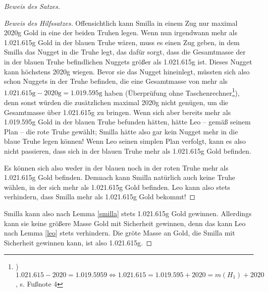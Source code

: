\begin{proof}[Beweis des Satzes]
\begin{proof}[Beweis des Hilfssatzes]
        Offensichtlich kann Smilla in einem Zug nur maximal 2020g Gold  in eine der beiden Truhen legen. Wenn nun 
        irgendwann mehr als 1.021.615g Gold in der blauen Truhe wären, muss es einen Zug geben, in dem Smilla das 
        Nugget in die Truhe legt, das dafür sorgt, dass die Gesamtmasse der in der blauen Truhe befindlichen Nuggets 
        größer als 1.021.615g ist. Dieses Nugget kann höchstens 2020g wiegen. Bevor sie das Nugget hineinlegt, 
        müssten sich also schon Nuggets in der Truhe befinden, die eine Gesamtmasse von mehr als $1.021.615\text{g}-
        2020\text{g}=1.019.595\text{g}$ haben (Überprüfung ohne Taschenrechner\footnote{) $1.021.615-2020=
        1.019.5959 \Leftrightarrow 1.021.615=1.019.595+2020=m(H_1)+2020$, s. Fußnote 4}), 
        denn sonst würden die zusätzlichen maximal 2020g nicht genügen, um die Gesamtmasse über 1.021.615g zu 
        bringen. Wenn sich aber bereits mehr als 1.019.595g Gold in der blauen Truhe befunden hätten, hätte Leo -- 
        gemäß seinem Plan -- die rote Truhe gewählt; Smilla hätte also gar kein Nugget mehr in die blaue Truhe 
        legen können! Wenn Leo seinen simplen Plan verfolgt, kann es also nicht passieren, dass sich in der blauen 
        Truhe mehr als 1.021.615g Gold befinden. 

        Es können sich also weder in der blauen noch in der roten Truhe mehr als 1.021.615g Gold befinden. Demnach 
        kann Smilla natürlich auch keine Truhe wählen, in der sich mehr als 1.021.615g Gold befinden. Leo kann also 
        stets verhindern, dass Smilla mehr als 1.021.615g Gold bekommt!
    \end{proof}
    \renewcommand{\qedsymbol}{$\blacksquare$}
    Smilla kann also nach Lemma \ref{smilla} stets 1.021.615g Gold gewinnen. Allerdings kann sie keine größere Masse 
    Gold mit Sicherheit gewinnen, denn das kann Leo nach Lemma \ref{leo} stets verhindern. Die gröte Masse an Gold, 
    die Smilla mit Sicherheit gewinnen kann, ist also 1.021.615g.
\end{proof}